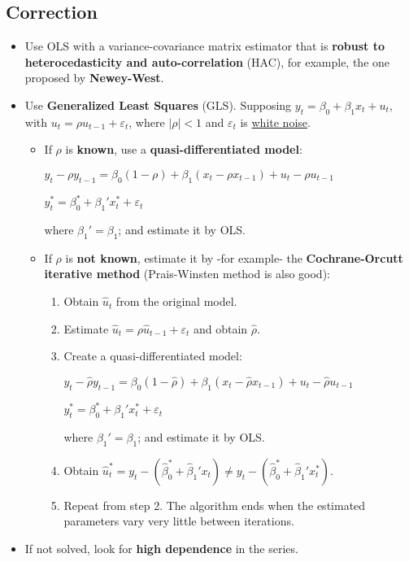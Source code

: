 \documentclass[10pt, a4paper, landscape]{extarticle}
\begin{document}
\begin{multicols}{3}
\subsection*{Correction}

\begin{itemize}[leftmargin=*]
	\item Use OLS with a variance-covariance matrix estimator that is \textbf{robust to heterocedasticity and auto-correlation} (HAC), for example, the one proposed by \textbf{Newey-West}.
	\item Use \textbf{Generalized Least Squares} (GLS). Supposing $y_t = \beta_0 + \beta_1 x_t + u_t$, with $u_t = \rho u_{t - 1} + \varepsilon_t$, where $\lvert \rho \rvert < 1$ and $\varepsilon_t$ is \underline{white noise}.
	\begin{itemize}[leftmargin=*]
		\item If $\rho$ is \textbf{known}, use a \textbf{quasi-differentiated model}:
		\begin{center}
			$y_t - \rho y_{t - 1} = \beta_0 (1 - \rho) + \beta_1 (x_t - \rho x_{t - 1}) + u_t - \rho u_{t - 1}$
			
			$y_t^* = \beta_0^* + \beta_1' x_t^* + \varepsilon_t$
		\end{center}
		where $\beta_1' = \beta_1$; and estimate it by OLS.
		\item If $\rho$ is \textbf{not known}, estimate it by -for example- the \textbf{Cochrane-Orcutt iterative method} (Prais-Winsten method is also good):
		\begin{enumerate}[leftmargin=*]
			\item Obtain $\hat{u}_t$ from the original model.
			\item Estimate $\hat{u}_t = \rho \hat{u}_{t-1} + \varepsilon_t$ and obtain $\hat{\rho}$.
			\item Create a quasi-differentiated model:
			\begin{center}
				$y_t - \hat{\rho} y_{t - 1} = \beta_0 (1 - \hat{\rho}) + \beta_1 (x_t - \hat{\rho} x_{t - 1}) + u_t - \hat{\rho} u_{t - 1}$
				
				$y_t^* = \beta_0^* + \beta_1' x_t^* + \varepsilon_t$
			\end{center}
			where $\beta_1' = \beta_1$; and estimate it by OLS.
			\item Obtain $\hat{u}_t^* = y_t - (\hat{\beta}_0^* + \hat{\beta}_1' x_t) \neq y_t - (\hat{\beta}_0^* + \hat{\beta}_1' x_t^*)$.
			\item Repeat from step 2. The algorithm ends when the estimated parameters vary very little between iterations.
		\end{enumerate}
	\end{itemize}
	\item If not solved, look for \textbf{high dependence} in the series.
\end{itemize}


\end{multicols}
\end{document}
